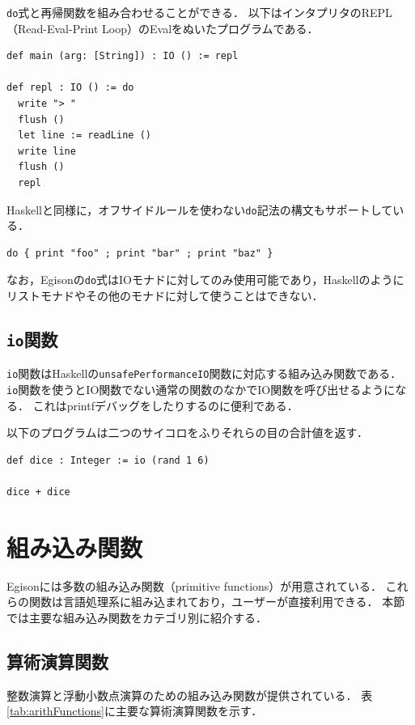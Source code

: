 \lstinline{do}式と再帰関数を組み合わせることができる．
以下はインタプリタのREPL（Read-Eval-Print Loop）のEvalをぬいたプログラムである．
\begin{lstlisting}[language=egison,numbers=none]
def main (arg: [String]) : IO () := repl

def repl : IO () := do
  write "> "
  flush ()
  let line := readLine ()
  write line
  flush ()
  repl
\end{lstlisting}

Haskellと同様に，オフサイドルールを使わない\lstinline{do}記法の構文もサポートしている．
\begin{lstlisting}[language=egison,numbers=none]
do { print "foo" ; print "bar" ; print "baz" }
\end{lstlisting}

なお，Egisonの\lstinline{do}式はIOモナドに対してのみ使用可能であり，Haskellのようにリストモナドやその他のモナドに対して使うことはできない．

\subsection{\texttt{io}関数}

\lstinline{io}関数はHaskellの\lstinline{unsafePerformanceIO}関数に対応する組み込み関数である．
\lstinline{io}関数を使うとIO関数でない通常の関数のなかでIO関数を呼び出せるようになる．
これはprintfデバッグをしたりするのに便利である．

以下のプログラムは二つのサイコロをふりそれらの目の合計値を返す．
\begin{lstlisting}[language=egison,numbers=none]
def dice : Integer := io (rand 1 6)

dice + dice
\end{lstlisting}

\section{組み込み関数}

Egisonには多数の組み込み関数（primitive functions）が用意されている．
これらの関数は言語処理系に組み込まれており，ユーザーが直接利用できる．
本節では主要な組み込み関数をカテゴリ別に紹介する．

\subsection{算術演算関数}

整数演算と浮動小数点演算のための組み込み関数が提供されている．
表\ref{tab:arithFunctions}に主要な算術演算関数を示す．

